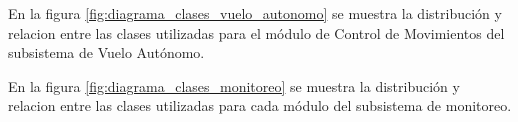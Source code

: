 %

En la figura \ref{fig:diagrama_clases_vuelo_autonomo} se muestra la distribución y relacion entre las clases utilizadas para el módulo de Control de Movimientos del subsistema de Vuelo Autónomo.



En la figura \ref{fig:diagrama_clases_monitoreo} se muestra la distribución y relacion entre las clases utilizadas para cada módulo del subsistema de monitoreo.

